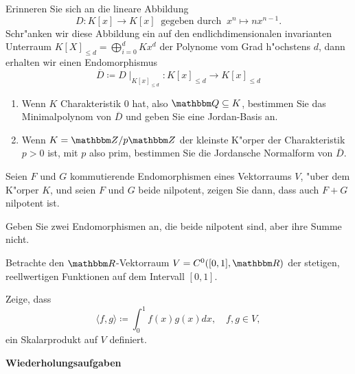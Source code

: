 \documentclass[a4,11pt]{article}
\begin{document}
\vspace*{-17mm}
{
\kopf
}


\begin{aufgabe}[4 Punkte]

Erinneren Sie sich an die lineare Abbildung
\[
D : K[x] \rightarrow K[x] \ \text{ gegeben durch } \ x^n \mapsto nx^{n-1}.
\]
Schr"anken wir diese Abbildung ein auf den endlichdimensionalen
invarianten Unterraum $K[X]_{\leq d} = \bigoplus_{i = 0}^d Kx^d$
der Polynome vom Grad h"ochstens $d$, dann erhalten wir einen Endomorphismus
\[
\overline{D} \coloneqq D\mid_{K[x]_{\leq d}} : K[x]_{\leq d} \rightarrow K[x]_{\leq d}
\]
  
\begin{enumerate}
\item Wenn $K$ Charakteristik $0$ hat, also $\Q \subseteq K$,
  bestimmen Sie das Minimalpolynom von $\overline{D}$ und geben Sie
  eine Jordan-Basis an. %
\item Wenn $K = \Z/p\Z$ der kleinste K"orper der Charakteristik $p >
  0$ ist, mit $p$ also prim, bestimmen Sie die Jordansche Normalform
  von $\overline{D}$.
\end{enumerate}

\end{aufgabe}

\begin{aufgabe}[4 Punkte]

Seien $F$ und $G$ kommutierende Endomorphismen eines Vektorraums $V$,
"uber dem K"orper $K$, und seien $F$ und $G$ beide nilpotent, zeigen
Sie dann, dass auch $F+G$ nilpotent ist.

Geben Sie zwei Endomorphismen an, die beide nilpotent sind, aber ihre
Summe nicht.
\end{aufgabe}


\begin{aufgabe}[4 Punkte]
Betrachte den $\R$-Vektorraum $V=C^0([0,1],\R)$ der stetigen,
reellwertigen Funktionen auf dem Intervall $[0,1]$.

Zeige, dass
$$
\langle f,g \rangle \coloneqq \int_0^1 f(x)g(x) dx, \quad f,g \in V,
$$
ein Skalarprodukt auf $V$ definiert.

\end{aufgabe}

\newpage
\bigskip
{\Large \bfseries Wiederholungsaufgaben}
\bigskip
\end{document}
